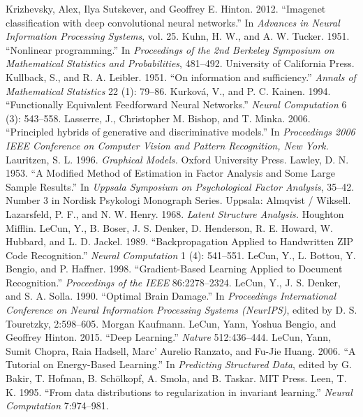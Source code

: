  Krizhevsky, Alex, Ilya Sutskever, and Geoffrey E. Hinton. 2012. ``Imagenet classification with deep convolutional neural networks.'' In \emph{Advances in Neural Information Processing Systems}, vol. 25.
 Kuhn, H. W., and A. W. Tucker. 1951. ``Nonlinear programming.'' In \emph{Proceedings of the 2nd Berkeley Symposium on Mathematical Statistics and Probabilities}, 481--492. University of California Press.
 Kullback, S., and R. A. Leibler. 1951. ``On information and sufficiency.'' \emph{Annals of Mathematical Statistics} 22 (1): 79--86.
 Kurkov\'a, V., and P. C. Kainen. 1994. ``Functionally Equivalent Feedforward Neural Networks.'' \emph{Neural Computation} 6 (3): 543--558.
 Lasserre, J., Christopher M. Bishop, and T. Minka. 2006. ``Principled hybrids of generative and discriminative models.'' In \emph{Proceedings 2006 IEEE Conference on Computer Vision and Pattern Recognition, New York.}
 Lauritzen, S. L. 1996. \emph{Graphical Models.} Oxford University Press.
 Lawley, D. N. 1953. ``A Modified Method of Estimation in Factor Analysis and Some Large Sample Results.'' In \emph{Uppsala Symposium on Psychological Factor Analysis}, 35--42. Number 3 in Nordisk Psykologi Monograph Series. Uppsala: Almqvist / Wiksell.
 Lazarsfeld, P. F., and N. W. Henry. 1968. \emph{Latent Structure Analysis.} Houghton Mifflin.
 LeCun, Y., B. Boser, J. S. Denker, D. Henderson, R. E. Howard, W. Hubbard, and L. D. Jackel. 1989. ``Backpropagation Applied to Handwritten ZIP Code Recognition.'' \emph{Neural Computation} 1 (4): 541--551.
 LeCun, Y., L. Bottou, Y. Bengio, and P. Haffner. 1998. ``Gradient-Based Learning Applied to Document Recognition.'' \emph{Proceedings of the IEEE} 86:2278--2324.
 LeCun, Y., J. S. Denker, and S. A. Solla. 1990. ``Optimal Brain Damage.'' In \emph{Proceedings International Conference on Neural Information Processing Systems (NeurIPS)}, edited by D. S. Touretzky, 2:598--605. Morgan Kaufmann.
 LeCun, Yann, Yoshua Bengio, and Geoffrey Hinton. 2015. ``Deep Learning.'' \emph{Nature} 512:436--444.
 LeCun, Yann, Sumit Chopra, Raia Hadsell, Marc' Aurelio Ranzato, and Fu-Jie Huang. 2006. ``A Tutorial on Energy-Based Learning.'' In \emph{Predicting Structured Data}, edited by G. Bakir, T. Hofman, B. Sch\"olkopf, A. Smola, and B. Taskar. MIT Press.
 Leen, T. K. 1995. ``From data distributions to regularization in invariant learning.'' \emph{Neural Computation} 7:974--981.
